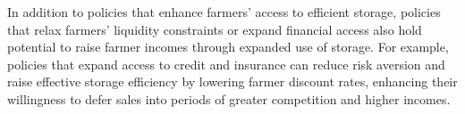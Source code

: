 In addition to policies that enhance farmers' access to efficient storage, policies that relax farmers' liquidity constraints or expand financial access also hold potential to raise farmer incomes through expanded use of storage. For example, policies that expand access to credit and insurance can reduce risk aversion and raise effective storage efficiency by lowering farmer discount rates, enhancing their willingness to defer sales into periods of greater competition and higher incomes.
